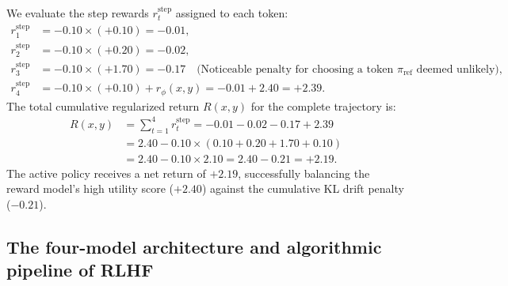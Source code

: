 \documentclass[../../main.tex]{subfiles}
\begin{document}
\begin{tcolorbox}[colback=cardBg,colframe=cardLine,arc=2pt,boxrule=0.5pt,title=\textbf{Pedagogical Walkthrough: PPO Regularized Reward Calculation with Concrete Numbers}]
We evaluate the step rewards $r_t^{\text{step}}$ assigned to each token:
\begin{align*}
r_1^{\text{step}} &= -0.10 \times (+0.10) = -0.01, \\
r_2^{\text{step}} &= -0.10 \times (+0.20) = -0.02, \\
r_3^{\text{step}} &= -0.10 \times (+1.70) = -0.17 \quad \text{(Noticeable penalty for choosing a token $\pi_{\text{ref}}$ deemed unlikely)}, \\
r_4^{\text{step}} &= -0.10 \times (+0.10) + r_\phi(x, y) = -0.01 + 2.40 = +2.39.
\end{align*}
The total cumulative regularized return $R(x, y)$ for the complete trajectory is:
\begin{align*}
R(x, y) &= \sum_{t=1}^4 r_t^{\text{step}} = -0.01 - 0.02 - 0.17 + 2.39 \\
&= 2.40 - 0.10 \times \left( 0.10 + 0.20 + 1.70 + 0.10 \right) \\
&= 2.40 - 0.10 \times 2.10 = 2.40 - 0.21 = \mathbf{+2.19}.
\end{align*}
The active policy receives a net return of $+2.19$, successfully balancing the reward model's high utility score ($+2.40$) against the cumulative KL drift penalty ($-0.21$).
\end{tcolorbox}

\subsection{The four-model architecture and algorithmic pipeline of RLHF}
\label{subsec:four_model_architecture_algorithm}
\end{document}
